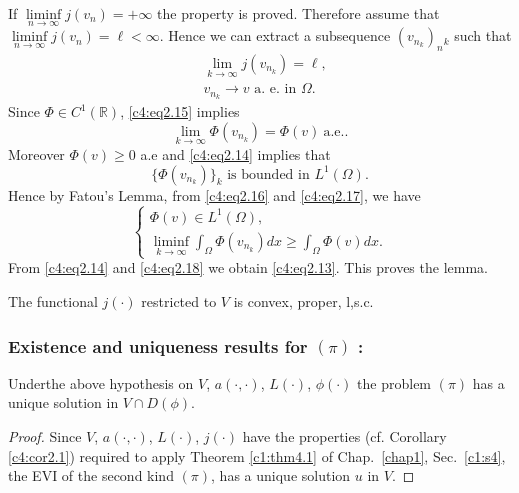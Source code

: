 If $\liminf \limits_{n \to \infty} j (v_n) = + \infty$ the property is proved. Therefore assume that $\liminf\limits_{ n \to \infty} j (v_n) = \ell < \infty$. Hence we can extract a subsequence $(v_{n_{k}})_n{_k}$ such that  
\begin{align}
& \lim_{k \to \infty} j (v_{n_k}) = \ell, \tag{2.14}\label{c4:eq2.14}\\
& v_{n_k} \to v \text { a. e. in } \Omega. \tag{2.15}\label{c4:eq2.15}
\end{align}
Since $\Phi \in C^1 (\mathbb{R})$, \eqref{c4:eq2.15} implies 
\begin{equation}
\lim_{k \to \infty} \Phi (v_{n_k}) = \Phi (v) ~\text{a.e.}. \tag{2.16}\label{c4:eq2.16}
\end{equation} 
Moreover $\Phi (v) \geq 0$ a.e and \eqref{c4:eq2.14} implies that
\begin{equation}
\{\Phi (v_{n_k})\}_k \text{ is bounded in } L^1 (\Omega). \tag{2.17}\label{c4:eq2.17}
\end{equation}
Hence by Fatou's Lemma, from \eqref{c4:eq2.16} and \eqref{c4:eq2.17}, we have
\begin{equation}
\begin{cases}
\Phi (v) \in L^1 (\Omega), \\
\liminf\limits_{k \to \infty} \int_\Omega \Phi (v_{n_k}) dx \geq \int_\Omega 
\Phi (v) dx. \tag{2.18}\label{c4:eq2.18}
\end{cases}
\end{equation}
From \eqref{c4:eq2.14} and \eqref{c4:eq2.18} we obtain \eqref{c4:eq2.13}. This  proves the lemma.

\setcounter{corollary}{0}
\begin{corollary}\label{c4:cor2.1}
The functional $j (\cdot)$ restricted to $V$ is convex, proper, l,s.c.
\end{corollary}

\subsubsection{Existence and uniqueness results for $(\pi)$ 
:}\label{c4:sss2.2.3}

\begin{theorem}\label{c4:thm2.1} %
Under\pageoriginale  the above hypothesis on $V$, $a (\cdot, \cdot)$, $L (\cdot)$, $\phi (\cdot)$ the problem $(\pi)$ has a unique solution in $V \cap D (\phi)$.
\end{theorem}

\begin{proof}
Since $V$, $a (\cdot, \cdot)$, $L(\cdot)$, $j (\cdot)$ have the 
properties (cf. Corollary \ref{c4:cor2.1}) required to apply Theorem 
\ref{c1:thm4.1} of Chap.~\ref{chap1}, Sec.~\ref{c1:s4}, the EVI of the
second kind $(\pi)$, has a unique solution $u$ in $V$. 
\end{proof}

